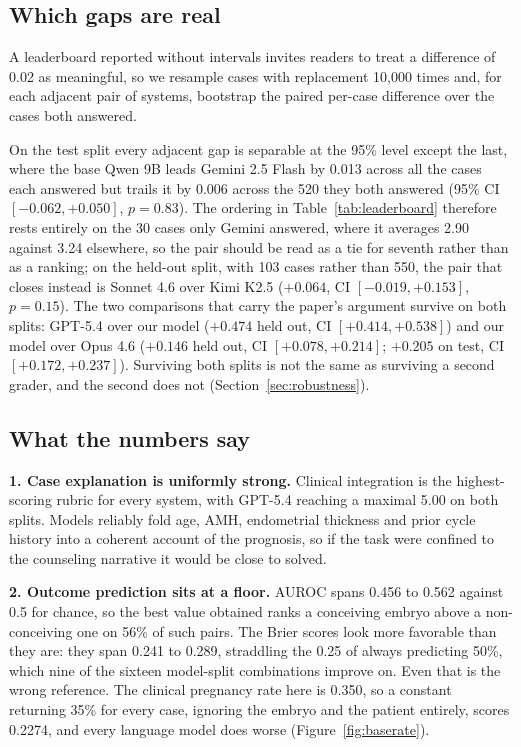 \documentclass[11pt]{article}
\begin{document}
\subsection{Which gaps are real}

A leaderboard reported without intervals invites readers to treat a difference
of 0.02 as meaningful, so we resample cases with replacement 10,000 times and, for
each adjacent pair of systems, bootstrap the paired per-case difference over the
cases both answered.

On the test split every adjacent gap is separable at the 95\% level except the
last, where the base Qwen 9B leads Gemini 2.5 Flash by 0.013 across all the cases
each answered but trails it by 0.006 across the 520 they both answered (95\% CI
$[-0.062, +0.050]$, $p{=}0.83$). The ordering in
Table~\ref{tab:leaderboard} therefore rests entirely on the 30 cases only Gemini
answered, where it averages 2.90 against 3.24 elsewhere, so the pair should be
read as a tie for seventh rather than as a ranking; on the held-out split, with 103 cases rather than 550, the pair
that closes instead is Sonnet 4.6 over Kimi K2.5 ($+0.064$, CI $[-0.019,
+0.153]$, $p{=}0.15$). The two comparisons that carry the paper's argument
survive on both splits: GPT-5.4 over our model ($+0.474$ held out, CI $[+0.414,
+0.538]$) and our model over Opus 4.6 ($+0.146$ held out, CI $[+0.078, +0.214]$;
$+0.205$ on test, CI $[+0.172, +0.237]$). Surviving both splits is not the same
as surviving a second grader, and the second does not
(Section~\ref{sec:robustness}).

\subsection{What the numbers say}

\textbf{1. Case explanation is uniformly strong.} Clinical integration is the
highest-scoring rubric for every system, with GPT-5.4 reaching a maximal 5.00 on
both splits. Models reliably fold age, AMH, endometrial thickness and prior cycle
history into a coherent account of the prognosis, so if the task were confined to
the counseling narrative it would be close to solved.

\textbf{2. Outcome prediction sits at a floor.} AUROC spans 0.456 to 0.562
against 0.5 for chance, so the best value obtained ranks a conceiving embryo
above a non-conceiving one on 56\% of such pairs. The Brier scores look more
favorable than they are: they span 0.241 to 0.289, straddling the 0.25 of always
predicting 50\%, which nine of the sixteen model-split combinations improve on.
Even that is the wrong reference. The clinical pregnancy rate here is 0.350, so a
constant returning 35\% for every case, ignoring the embryo and the patient
entirely, scores 0.2274, and every language model does worse
(Figure~\ref{fig:baserate}).
\end{document}
